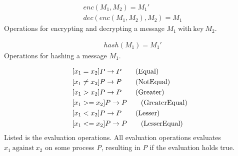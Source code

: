 
\begin{align*}
    &enc(M_1, M_2) = M_1' \tag{Encrypt}\\
    &dec(enc(M_1, M_2),M_2) = M_1 \tag{Decrypt}
\end{align*}
Operations for encrypting and decrypting a message $M_1\ \mathrm{with\ key}\ M_2$.


\begin{align}
    &hash(M_1) = M_1' \tag{Hashing}
\end{align}
Operations for hashing a message $M_1$.


\begin{align}
    &[x_1 = x_2]P \rightarrow P \tag{Equal}\\
    &[x_1 \neq x_2]P \rightarrow P \tag{NotEqual}\\
    &[x_1 > x_2]P \rightarrow P \tag{Greater}\\
    &[x_1 >= x_2]P \rightarrow P \tag{GreaterEqual}\\
    &[x_1 < x_2]P \rightarrow P \tag{Lesser}\\
    &[x_1 <= x_2]P \rightarrow P \tag{LesserEqual}
\end{align}
Listed is the evaluation operations. All evaluation operations evaluates $x_1\ \mathrm{against}\ x_2$ on some process \textit{P}, resulting in \textit{P} if the evaluation holds true.


